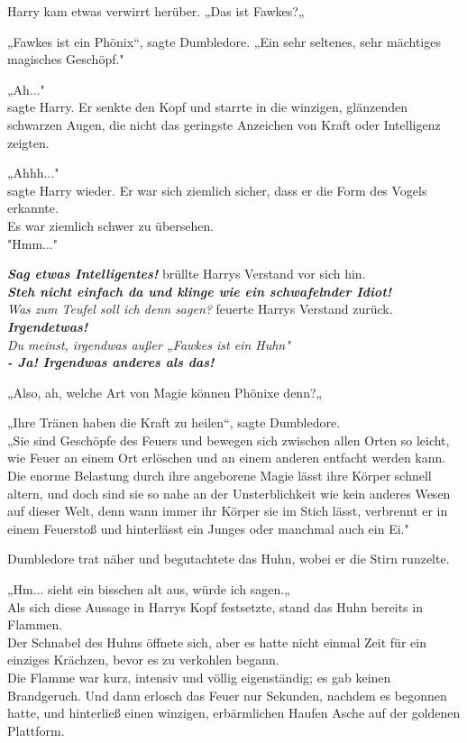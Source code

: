 {Harry kam etwas verwirrt herüber. „Das ist Fawkes?„

„Fawkes ist ein Phönix“, sagte Dumbledore. „Ein sehr seltenes, sehr mächtiges magisches Geschöpf."

„Ah..."\\ sagte Harry. Er senkte den Kopf und starrte in die winzigen, glänzenden schwarzen Augen, die nicht das geringste Anzeichen von Kraft oder Intelligenz zeigten.

„Ahhh..."\\ sagte Harry wieder. Er war sich ziemlich sicher, dass er die Form des Vogels erkannte.\\ Es war ziemlich schwer zu übersehen.\\ "Hmm..."

\textbf{\emph{Sag etwas Intelligentes!}} brüllte Harrys Verstand vor sich hin.\\ \textbf{\emph{Steh nicht einfach da und klinge wie ein schwafelnder Idiot!}}\\ \emph{Was zum Teufel soll ich denn sagen?} feuerte Harrys Verstand zurück.\\ \textbf{\emph{Irgendetwas!}}\\ \emph{Du meinst, irgendwas außer „Fawkes ist ein Huhn"}\\ \textbf{\emph{- Ja! Irgendwas anderes als das!}}

„Also, ah, welche Art von Magie können Phönixe denn?„

„Ihre Tränen haben die Kraft zu heilen“, sagte Dumbledore.\\ „Sie sind Geschöpfe des Feuers und bewegen sich zwischen allen Orten so leicht, wie Feuer an einem Ort erlöschen und an einem anderen entfacht werden kann.\\ Die enorme Belastung durch ihre angeborene Magie lässt ihre Körper schnell altern, und doch sind sie so nahe an der Unsterblichkeit wie kein anderes Wesen auf dieser Welt, denn wann immer ihr Körper sie im Stich lässt, verbrennt er in einem Feuerstoß und hinterlässt ein Junges oder manchmal auch ein Ei."

Dumbledore trat näher und begutachtete das Huhn, wobei er die Stirn runzelte.

„Hm... sieht ein bisschen alt aus, würde ich sagen.„\\ Als sich diese Aussage in Harrys Kopf festsetzte, stand das Huhn bereits in Flammen.\\ Der Schnabel des Huhns öffnete sich, aber es hatte nicht einmal Zeit für ein einziges Krächzen, bevor es zu verkohlen begann.\\ Die Flamme war kurz, intensiv und völlig eigenständig; es gab keinen Brandgeruch. Und dann erlosch das Feuer nur Sekunden, nachdem es begonnen hatte, und hinterließ einen winzigen, erbärmlichen Haufen Asche auf der goldenen Plattform.

}
